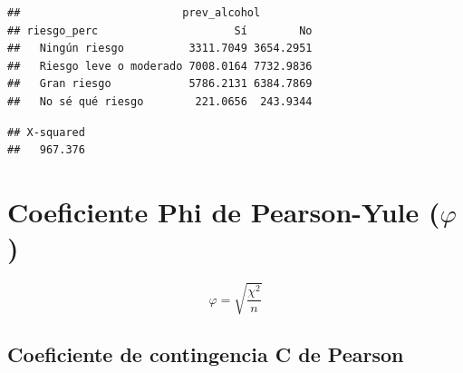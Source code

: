 \documentclass[spanish,]{book}
\newenvironment{Shaded}{\begin{snugshade}}{\end{snugshade}}
\newcommand{\KeywordTok}[1]{\textcolor[rgb]{0.13,0.29,0.53}{\textbf{#1}}}
\newcommand{\DataTypeTok}[1]{\textcolor[rgb]{0.13,0.29,0.53}{#1}}
\newcommand{\StringTok}[1]{\textcolor[rgb]{0.31,0.60,0.02}{#1}}
\newcommand{\OperatorTok}[1]{\textcolor[rgb]{0.81,0.36,0.00}{\textbf{#1}}}
\newcommand{\NormalTok}[1]{#1}
\begin{document}
\begin{verbatim}
##                         prev_alcohol
## riesgo_perc                     Sí        No
##   Ningún riesgo          3311.7049 3654.2951
##   Riesgo leve o moderado 7008.0164 7732.9836
##   Gran riesgo            5786.2131 6384.7869
##   No sé qué riesgo        221.0656  243.9344
\end{verbatim}

\begin{Shaded}
\end{Shaded}

\begin{verbatim}
## X-squared 
##   967.376
\end{verbatim}

\section{\texorpdfstring{Coeficiente Phi de Pearson-Yule
(\(\varphi\))}{Coeficiente Phi de Pearson-Yule (\textbackslash{}varphi)}}\label{coeficiente-phi-de-pearson-yule-varphi}

\[
\varphi = \sqrt{\frac{\chi^2}{n}}
\]

\begin{Shaded}
\end{Shaded}

\subsection{Coeficiente de contingencia C de
Pearson}\label{coeficiente-de-contingencia-c-de-pearson}
\end{document}
